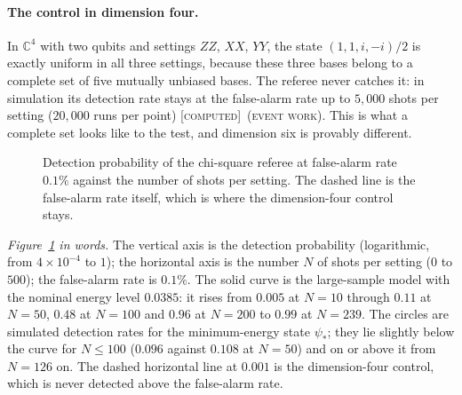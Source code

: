 \documentclass[11pt]{article}
\newcommand{\C}{\mathbb{C}}
\newcommand{\E}{E}                       %
\newcommand{\st}[1]{\textsc{[#1]}}
\newcommand{\stcomp}{\st{computed}}
\newcommand{\event}{\textsc{(event work)}}
\theoremstyle{definition}
\theoremstyle{remark}
\begin{document}
\paragraph{The control in dimension four.} In $\C^4$ with two qubits and settings $ZZ$, $XX$, $YY$, the state
$(1,1,i,-i)/2$ is exactly uniform in all three settings, because these three bases belong to a complete set of five
mutually unbiased bases. The referee never catches it: in simulation its detection rate stays at the false-alarm
rate up to $5{,}000$ shots per setting ($20{,}000$ runs per point) \stcomp\ \event. This is what a complete set
looks like to the test, and dimension six is provably different.

\begin{figure}[ht]\centering
{}
\caption{Detection probability of the chi-square referee at false-alarm rate $0.1\%$ against the number of shots per
setting. The dashed line is the false-alarm rate itself, which is where the dimension-four control stays.}\label{fig:hide}
\end{figure}

\noindent\emph{Figure~\ref{fig:hide} in words.} The vertical axis is the detection probability (logarithmic, from
$4\times10^{-4}$ to $1$); the horizontal axis is the number $N$ of shots per setting ($0$ to $500$); the false-alarm
rate is $0.1\%$. The solid curve is the large-sample model with the nominal energy level $0.0385$: it rises from $0.005$
at $N=10$ through $0.11$ at $N=50$, $0.48$ at $N=100$ and $0.96$ at $N=200$ to $0.99$ at $N=239$. The circles are
simulated detection rates for the minimum-energy state $\psi_\ast$; they lie slightly below the curve for $N\le100$
($0.096$ against $0.108$ at $N=50$) and on or above it from $N=126$ on. The dashed horizontal line at $0.001$ is the
dimension-four control, which is never detected above the false-alarm rate.
\end{document}

